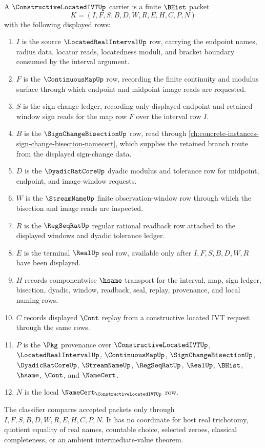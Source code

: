\begin{definition}
\label{def:constructive-located-ivt-carrier}
A $\ConstructiveLocatedIVTUp$ carrier is a finite $\BHist$ packet
$$
K=(I,F,S,B,D,W,R,E,H,C,P,N)
$$
with the following displayed rows:
\begin{enumerate}
\item $I$ is the source $\LocatedRealIntervalUp$ row, carrying the endpoint names, radius data, locator reads, locatedness moduli, and bracket boundary consumed by the interval argument.
\item $F$ is the $\ContinuousMapUp$ row, recording the finite continuity and modulus surface through which endpoint and midpoint image reads are requested.
\item $S$ is the sign-change ledger, recording only displayed endpoint and retained-window sign reads for the map row $F$ over the interval row $I$.
\item $B$ is the $\SignChangeBisectionUp$ row, read through \autoref{ch:concrete-instances-sign-change-bisection-namecert}, which supplies the retained branch route from the displayed sign-change data.
\item $D$ is the $\DyadicRatCoreUp$ dyadic modulus and tolerance row for midpoint, endpoint, and image-window requests.
\item $W$ is the $\StreamNameUp$ finite observation-window row through which the bisection and image reads are inspected.
\item $R$ is the $\RegSeqRatUp$ regular rational readback row attached to the displayed windows and dyadic tolerance ledger.
\item $E$ is the terminal $\RealUp$ seal row, available only after $I,F,S,B,D,W,R$ have been displayed.
\item $H$ records componentwise $\hsame$ transport for the interval, map, sign ledger, bisection, dyadic, window, readback, seal, replay, provenance, and local naming rows.
\item $C$ records displayed $\Cont$ replay from a constructive located IVT request through the same rows.
\item $P$ is the $\Pkg$ provenance over $\ConstructiveLocatedIVTUp$, $\LocatedRealIntervalUp$, $\ContinuousMapUp$, $\SignChangeBisectionUp$, $\DyadicRatCoreUp$, $\StreamNameUp$, $\RegSeqRatUp$, $\RealUp$, $\BHist$, $\hsame$, $\Cont$, and $\NameCert$.
\item $N$ is the local $\NameCert_{\ConstructiveLocatedIVTUp}$ row.
\end{enumerate}
The classifier compares accepted packets only through $I,F,S,B,D,W,R,E,H,C,P,N$. It has no coordinate for host real trichotomy, quotient equality of real names, countable choice, selected zeroes, classical completeness, or an ambient intermediate-value theorem.
\end{definition}

